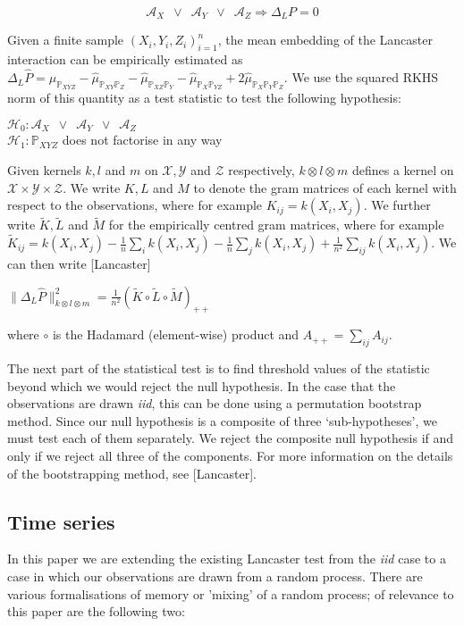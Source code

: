 \documentclass{article}
\begin{document}
\[\mathcal{A}_X \enspace \lor \enspace \mathcal{A}_Y \enspace \lor \enspace \mathcal{A}_Z \Rightarrow \Delta_LP=0 \]

Given a finite sample $(X_i,Y_i,Z_i)_{i=1}^n$, the mean embedding of the Lancaster interaction can be empirically estimated as $\Delta_L\hat{P} = \hat{\mu}_{\mathbb{P}_{XYZ}} - \hat{\mu}_{\mathbb{P}_{XY}\mathbb{P}_{Z}} - \hat{\mu}_{\mathbb{P}_{XZ}\mathbb{P}_{Y}} - \hat{\mu}_{\mathbb{P}_{X}\mathbb{P}_{YZ}} + 2\hat{\mu}_{\mathbb{P}_{X}\mathbb{P}_{Y}\mathbb{P}_{Z}}$. We use the squared RKHS norm of this quantity as a test statistic to test the following hypothesis:

$\mathcal{H}_0: \mathcal{A}_X \enspace \lor \enspace \mathcal{A}_Y \enspace \lor \enspace \mathcal{A}_Z $\\
$\mathcal{H}_1: \mathbb{P}_{XYZ}$ does not factorise in any way

Given kernels $k,l$ and $m$ on $\mathcal{X},\mathcal{Y}$ and $\mathcal{Z}$ respectively, $k\otimes l \otimes m$ defines a kernel on $\mathcal{X}\times \mathcal{Y} \times \mathcal{Z}$. We write $K, L$ and $M$ to denote the gram matrices of each kernel with respect to the observations, where for example $K_{ij} = k(X_i,X_j)$. We further write $\tilde{K}, \tilde{L}$ and $\tilde{M}$ for the empirically centred gram matrices, where for example $\tilde{K}_{ij} = k(X_i,X_j) - \frac{1}{n}\sum_ik(X_i,X_j)  - \frac{1}{n}\sum_jk(X_i,X_j) + \frac{1}{n^2}\sum_{ij}k(X_i,X_j)$. We can then write [Lancaster]

$\|\Delta_L\hat{P}\|_{k\otimes l \otimes m}^2 = \frac{1}{n^2}\left(\tilde{K}\circ\tilde{L}\circ\tilde{M}\right)_{++}$

where $\circ$ is the Hadamard (element-wise) product and $A_{++} = \sum_{ij}A_{ij}$.

The next part of the statistical test is to find threshold values of the statistic beyond which we would reject the null hypothesis. In the case that the observations are drawn \emph{iid}, this can be done using a permutation bootstrap method. Since our null hypothesis is a composite of three `sub-hypotheses', we must test each of them separately. We reject the composite null hypothesis if and only if we reject all three of the components. For more information on the details of the bootstrapping method, see [Lancaster].

\subsection{Time series}
In this paper we are extending the existing Lancaster test from the \emph{iid} case to a case in which our observations are drawn from a random process. There are various formalisations of memory or 'mixing' of a random process; of relevance to this paper are the following two:
\end{document}
